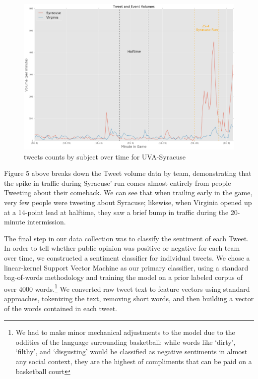 \documentclass[12pt]{article}
\begin{document}
\begin{doublespacing}
\begin{figure} [H]
	\centering
	\includegraphics[scale = 0.4] {Images/Cuse_UVA_TweetVolume.png} 
	\caption{tweets counts by subject over time for UVA-Syracuse}
\end{figure}

Figure 5 above breaks down the Tweet volume data by team, demonstrating that the spike in traffic during Syracuse' run comes almost entirely from people Tweeting about their comeback. We can see that when trailing early in the game, very few people were tweeting about Syracuse; likewise, when Virginia opened up at a 14-point lead at halftime, they saw a brief bump in traffic during the 20-minute intermission. 

The final step in our data collection was to classify the sentiment of each Tweet. In order to tell whether public opinion was positive or negative for each team over time, we constructed a sentiment classifier for individual tweets. We chose a linear-kernel Support Vector Machine as our primary classifier, using a standard bag-of-words methodology and training the model on a prior labeled corpus of over 4000 words.\footnote{We had to make minor mechanical adjustments to the model due to the oddities of the language surrounding basketball; while words like `dirty', `filthy', and `disgusting' would be classified as negative sentiments in almost any social context, they are the highest of compliments that can be paid on a basketball court} We converted raw tweet text to feature vectors using standard approaches, tokenizing the text, removing short words, and then building a vector of the words contained in each tweet. 


\end{doublespacing}
\end{document}
